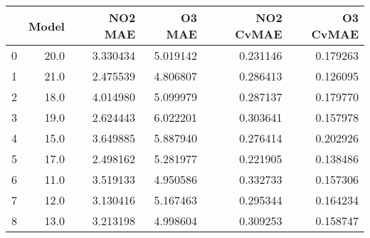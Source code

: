 \begin{tabular}{lrrrrr}
\toprule
{} &  Model &   NO2 MAE &    O3 MAE &  NO2 CvMAE &  O3 CvMAE \\
\midrule
0 &   20.0 &  3.330434 &  5.019142 &   0.231146 &  0.179263 \\
1 &   21.0 &  2.475539 &  4.806807 &   0.286413 &  0.126095 \\
2 &   18.0 &  4.014980 &  5.099979 &   0.287137 &  0.179770 \\
3 &   19.0 &  2.624443 &  6.022201 &   0.303641 &  0.157978 \\
4 &   15.0 &  3.649885 &  5.887940 &   0.276414 &  0.202926 \\
5 &   17.0 &  2.498162 &  5.281977 &   0.221905 &  0.138486 \\
6 &   11.0 &  3.519133 &  4.950586 &   0.332733 &  0.157306 \\
7 &   12.0 &  3.130416 &  5.167463 &   0.295344 &  0.164234 \\
8 &   13.0 &  3.213198 &  4.998604 &   0.309253 &  0.158747 \\
\bottomrule
\end{tabular}
